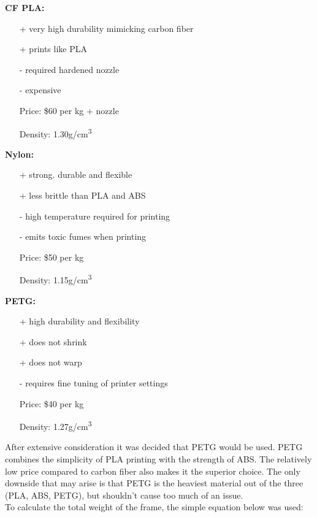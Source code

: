 \documentclass[12pt]{article}
\begin{document}
\textbf{CF PLA:}
\renewcommand{\labelitemi}{\textperiodcentered}
\begin{itemize}
\item[+] very high durability mimicking carbon fiber
\item[+] prints like PLA
\item[-] required hardened nozzle
\item[-] expensive
\item[Price:] \$60 per kg + nozzle
\item[Density:] 1.30g/cm\textsuperscript{3}
\end{itemize}
\vspace{5mm}

\textbf{Nylon:}
\renewcommand{\labelitemi}{\textperiodcentered}
\begin{itemize}
\item[+] strong. durable and flexible
\item[+] less brittle than PLA and ABS
\item[-] high temperature required for printing
\item[-] emits toxic fumes when printing
\item[Price:] \$50 per kg
\item[Density:] 1.15g/cm\textsuperscript{3}
\end{itemize}
\vspace{5mm}

\textbf{PETG:}
\renewcommand{\labelitemi}{\textperiodcentered}
\begin{itemize}
\item[+] high durability and flexibility
\item[+] does not shrink
\item[+] does not warp
\item[-] requires fine tuning of printer settings
\item[Price:] \$40 per kg
\item[Density:] 1.27g/cm\textsuperscript{3}
\end{itemize}

After extensive consideration it was decided that PETG would be used. PETG combines the simplicity of PLA printing with the strength of ABS. The relatively low price compared to carbon fiber also makes it the superior choice. The only downside that may arise is that PETG is the heaviest material out of the three (PLA, ABS, PETG), but shouldn't cause too much of an issue. 
\\

To calculate the total weight of the frame, the simple equation below was used:
\\
\end{document}

